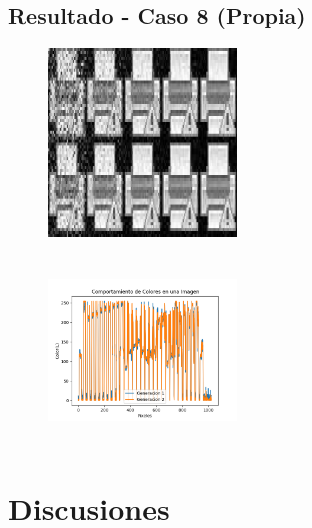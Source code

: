\documentclass[letterpaper, 10 pt, conference]{ieeeconf}  %
\begin{document}
\subsection{\textbf{Resultado - Caso 8 (Propia)}}

\begin{figure}[h]
\centering
\includegraphics[width=5cm, height=5cm]{Collage2}
\end{figure}

\begin{figure}[h]
\centering
\includegraphics[width=5cm, height=5cm]{MejorGeneracion8}
\end{figure}



\section{\textbf{Discusiones}}
\end{document}

